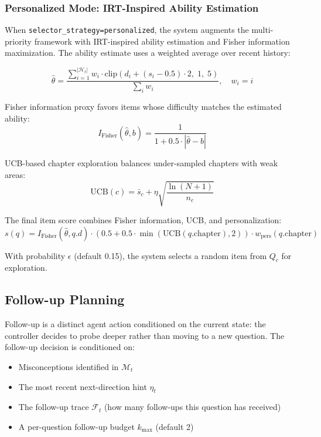 ﻿\documentclass[final,3p,times,authoryear]{elsarticle}
\begin{document}
\subsubsection{Personalized Mode: IRT-Inspired Ability Estimation}

\noindent When \texttt{selector\_strategy=personalized}, the system augments the multi-priority framework with IRT-inspired ability estimation and Fisher information maximization. The ability estimate uses a weighted average over recent history:

\begin{equation}
\hat{\theta} = \frac{\sum_{i=1}^{|\mathcal{H}_t|} w_i \cdot \text{clip}\left(d_i + (s_i - 0.5) \cdot 2, \; 1, \; 5\right)}{\sum_{i} w_i}, \quad w_i = i
\label{eq:ability}
\end{equation}

Fisher information proxy favors items whose difficulty matches the estimated ability:
\begin{equation}
I_{\text{Fisher}}(\hat{\theta}, b) = \frac{1}{1 + 0.5 \cdot |\hat{\theta} - b|}
\end{equation}

UCB-based chapter exploration balances under-sampled chapters with weak areas:
\begin{equation}
\text{UCB}(c) = \bar{s}_c + \eta \sqrt{\frac{\ln(N+1)}{n_c}}
\end{equation}

The final item score combines Fisher information, UCB, and personalization:
\begin{equation}
s(q) = I_{\text{Fisher}}(\hat{\theta}, q.d) \cdot \left(0.5 + 0.5 \cdot \min(\text{UCB}(q.\text{chapter}), 2)\right) \cdot w_{\text{pers}}(q.\text{chapter})
\end{equation}

With probability $\epsilon$ (default 0.15), the system selects a random item from $Q_c$ for exploration.

\subsection{Follow-up Planning}
\label{sec:followup}

\noindent Follow-up is a distinct agent action conditioned on the current state: the controller decides to probe deeper rather than moving to a new question. The follow-up decision is conditioned on:
\begin{itemize}
    \item Misconceptions identified in $\mathcal{M}_t$
    \item The most recent next-direction hint $\eta_t$
    \item The follow-up trace $\mathcal{F}_t$ (how many follow-ups this question has received)
    \item A per-question follow-up budget $k_{\max}$ (default 2)
\end{itemize}
\end{document}
